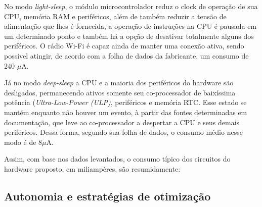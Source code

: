 No modo \textit{light-sleep}, o módulo microcontrolador reduz o clock de operação de sua CPU, memória RAM e periféricos, além de também reduzir a tensão de alimentação que lhes é fornecida, a operação de instruções na CPU é pausada em um determinado ponto e também há a opção de desativar totalmente alguns dos periféricos. O rádio Wi-Fi é capaz ainda de manter uma conexão ativa, sendo possível atingir, de acordo com a folha de dados da fabricante, um consumo de 240 $\mu$A. 

Já no modo \textit{deep-sleep} a CPU e a maioria dos periféricos do hardware são desligados, permanecendo ativos somente seu co-processador de baixíssima potência (\textit{Ultra-Low-Power (ULP)}, periféricos e memória RTC. Esse estado se mantém enquanto não houver um evento, à partir das fontes determinadas em documentação, que leve ao co-processador a despertar a CPU e seus demais periféricos. Dessa forma, segundo sua folha de dados, o consumo médio nesse modo é de 8$\mu$A.

Assim, com base nos dados levantados, o consumo típico dos circuitos do hardware proposto, em miliampères, são resumidamente:

	\begin{table}[!h]
	\captionsetup{width=7cm}%
    \end{table}

\subsection{Autonomia e estratégias de otimização}


